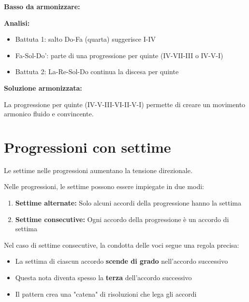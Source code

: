 \begin{esempio}
	\label{ex:basso_dato_progressione}
	
	\textbf{Basso da armonizzare:}
	
	\textbf{Analisi:}
	\begin{itemize}
		\item Battuta 1: salto Do-Fa (quarta) suggerisce I-IV
		\item Fa-Sol-Do': parte di una progressione per quinte (IV-VII-III o IV-V-I)
		\item Battuta 2: La-Re-Sol-Do continua la discesa per quinte
	\end{itemize}
	
	\textbf{Soluzione armonizzata:}
	
	La progressione per quinte (IV-V-III-VI-II-V-I) permette di creare un movimento armonico fluido e convincente.
\end{esempio}

\section{Progressioni con settime}
\label{sec:progressioni_settime}

Le settime nelle progressioni aumentano la tensione direzionale.

\begin{regola}
	\label{reg:progressioni_settime}
	Nelle progressioni, le settime possono essere impiegate in due modi:
	
	\begin{enumerate}
		\item \textbf{Settime alternate:} Solo alcuni accordi della progressione hanno la settima
		\item \textbf{Settime consecutive:} Ogni accordo della progressione è un accordo di settima
	\end{enumerate}
	
	Nel caso di settime consecutive, la condotta delle voci segue una regola precisa:
	\begin{itemize}
		\item La settima di ciascun accordo \textbf{scende di grado} nell'accordo successivo
		\item Questa nota diventa spesso la \textbf{terza} dell'accordo successivo
		\item Il pattern crea una "catena" di risoluzioni che lega gli accordi
	\end{itemize}
\end{regola}

